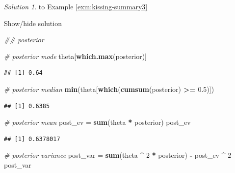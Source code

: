 \documentclass[
]{book}
\newenvironment{Shaded}{\begin{snugshade}}{\end{snugshade}}
\newcommand{\CommentTok}[1]{\textcolor[rgb]{0.56,0.35,0.01}{\textit{#1}}}
\newcommand{\DecValTok}[1]{\textcolor[rgb]{0.00,0.00,0.81}{#1}}
\newcommand{\FloatTok}[1]{\textcolor[rgb]{0.00,0.00,0.81}{#1}}
\newcommand{\KeywordTok}[1]{\textcolor[rgb]{0.13,0.29,0.53}{\textbf{#1}}}
\newcommand{\NormalTok}[1]{#1}
\newcommand{\OperatorTok}[1]{\textcolor[rgb]{0.81,0.36,0.00}{\textbf{#1}}}
\newcommand{\StringTok}[1]{\textcolor[rgb]{0.31,0.60,0.02}{#1}}
\theoremstyle{definition}
\theoremstyle{definition}
\theoremstyle{definition}
\theoremstyle{remark}
\newtheorem*{solution}{Solution}
\begin{document}
\begin{solution}
{}to Example \ref{exm:kissing-summary3}
\end{solution}

Show/hide solution

\begin{Shaded}
\begin{Highlighting}[]
\CommentTok{\#\# posterior}

\CommentTok{\# posterior mode}
\NormalTok{theta[}\KeywordTok{which.max}\NormalTok{(posterior)]}
\end{Highlighting}
\end{Shaded}

\begin{verbatim}
## [1] 0.64
\end{verbatim}

\begin{Shaded}
\begin{Highlighting}[]
\CommentTok{\# posterior median}
\KeywordTok{min}\NormalTok{(theta[}\KeywordTok{which}\NormalTok{(}\KeywordTok{cumsum}\NormalTok{(posterior) }\OperatorTok{\textgreater{}=}\StringTok{ }\FloatTok{0.5}\NormalTok{)])}
\end{Highlighting}
\end{Shaded}

\begin{verbatim}
## [1] 0.6385
\end{verbatim}

\begin{Shaded}
\begin{Highlighting}[]
\CommentTok{\# posterior mean}
\NormalTok{post\_ev =}\StringTok{ }\KeywordTok{sum}\NormalTok{(theta }\OperatorTok{*}\StringTok{ }\NormalTok{posterior)}
\NormalTok{post\_ev}
\end{Highlighting}
\end{Shaded}

\begin{verbatim}
## [1] 0.6378017
\end{verbatim}

\begin{Shaded}
\begin{Highlighting}[]
\CommentTok{\# posterior variance}
\NormalTok{post\_var =}\StringTok{ }\KeywordTok{sum}\NormalTok{(theta }\OperatorTok{\^{}}\StringTok{ }\DecValTok{2} \OperatorTok{*}\StringTok{ }\NormalTok{posterior) }\OperatorTok{{-}}\StringTok{ }\NormalTok{post\_ev }\OperatorTok{\^{}}\StringTok{ }\DecValTok{2}
\NormalTok{post\_var}
\end{Highlighting}
\end{Shaded}
\end{document}
